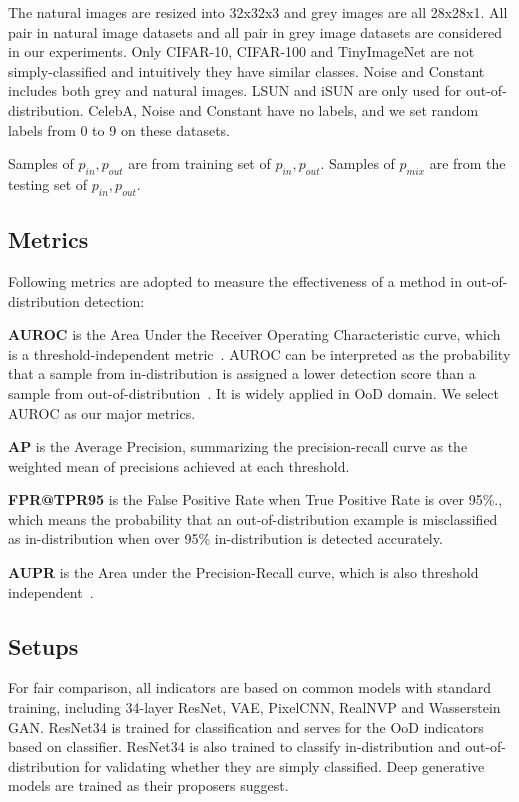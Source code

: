 \documentclass[letterpaper]{article} %
\newcommand{\pin}{p_{in}}
\newcommand{\pout}{p_{out}}
\newcommand{\pmix}{p_{mix}}
\begin{document}
The natural images are resized into 32x32x3 and grey images are all 28x28x1. All pair in natural image datasets and all pair in grey image datasets are considered in our experiments. Only CIFAR-10, CIFAR-100 and TinyImageNet are not simply-classified and intuitively they have similar classes. Noise and Constant includes both grey and natural images. LSUN and iSUN are only used for out-of-distribution. CelebA, Noise and Constant have no labels, and we set random labels from 0 to 9 on these datasets. 

Samples of $\pin, \pout$ are from training set of $\pin, \pout$. Samples of $\pmix$ are from the testing set of $\pin, \pout$. 

\subsection{Metrics}
Following metrics are adopted to measure the effectiveness of a method in out-of-distribution detection:

\noindent \textbf{AUROC} is the Area Under the Receiver Operating Characteristic curve, which is a threshold-independent metric~\cite{davis2006relationship}. AUROC can be interpreted as the probability that a sample from in-distribution is assigned a lower detection score than a sample from out-of-distribution~\cite{fawcett2006introduction}. It is widely applied in OoD domain. We select AUROC as our major metrics. 


\noindent \textbf{AP} is the Average Precision, summarizing the precision-recall curve as the weighted mean of precisions achieved at each threshold. 

\noindent \textbf{FPR@TPR95} is the False Positive Rate when True Positive Rate is over 95\%., which means the probability that an out-of-distribution example is misclassified as in-distribution when over 95\% in-distribution is detected accurately.

\noindent \textbf{AUPR} is the Area under the Precision-Recall curve, which is also threshold independent~\cite{saito2015precision}. %


\subsection{Setups} 
For fair comparison, all indicators are based on common models with standard training, including 34-layer ResNet, VAE, PixelCNN, RealNVP and Wasserstein GAN. ResNet34 is trained for classification and serves for the OoD indicators based on classifier. ResNet34 is also trained to classify in-distribution and out-of-distribution for validating whether they are simply classified. Deep generative models are trained as their proposers suggest. 
\end{document}
